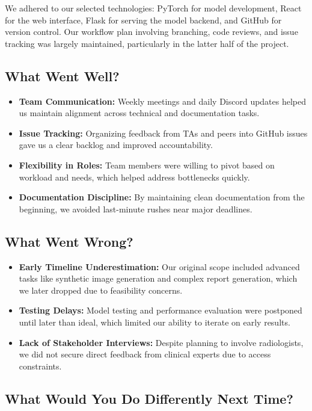 \documentclass{article}
\begin{document}
We adhered to our selected technologies: PyTorch for model development, React for the web interface, Flask for serving the model backend, and GitHub for version control. Our workflow plan involving branching, code reviews, and issue tracking was largely maintained, particularly in the latter half of the project.

\subsection{What Went Well?}

\begin{itemize}
    \item \textbf{Team Communication:} Weekly meetings and daily Discord updates helped us maintain alignment across technical and documentation tasks.
    \item \textbf{Issue Tracking:} Organizing feedback from TAs and peers into GitHub issues gave us a clear backlog and improved accountability.
    \item \textbf{Flexibility in Roles:} Team members were willing to pivot based on workload and needs, which helped address bottlenecks quickly.
    \item \textbf{Documentation Discipline:} By maintaining clean documentation from the beginning, we avoided last-minute rushes near major deadlines.
\end{itemize}

\subsection{What Went Wrong?}

\begin{itemize}
    \item \textbf{Early Timeline Underestimation:} Our original scope included advanced tasks like synthetic image generation and complex report generation, which we later dropped due to feasibility concerns.
    \item \textbf{Testing Delays:} Model testing and performance evaluation were postponed until later than ideal, which limited our ability to iterate on early results.
    \item \textbf{Lack of Stakeholder Interviews:} Despite planning to involve radiologists, we did not secure direct feedback from clinical experts due to access constraints.
\end{itemize}

\subsection{What Would You Do Differently Next Time?}
\end{document}
